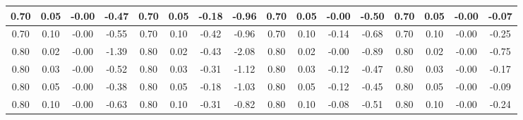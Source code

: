{\begin{tabular}{c|c|c|c||c|c|c|c||c|c|c|c||c|c|c|c}
0.70 & 0.05 & {\cellcolor{green}-0.00} & -0.47 &    0.70 & 0.05 & -0.18 & -0.96 &    0.70 & 0.05 & {\cellcolor{green}-0.00} & -0.50 &    0.70 & 0.05 & {\cellcolor{green}-0.00} & {\cellcolor{yellow}-0.07} \\ \hline
0.70 & 0.10 & {\cellcolor{green}-0.00} & -0.55 &    0.70 & 0.10 & -0.42 & -0.96 &    0.70 & 0.10 & -0.14 & -0.68 &    0.70 & 0.10 & {\cellcolor{green}-0.00} & -0.25 \\ \hline\hline
0.80 & 0.02 & {\cellcolor{green}-0.00} & -1.39 &    0.80 & 0.02 & -0.43 & -2.08 &    0.80 & 0.02 & {\cellcolor{green}-0.00} & -0.89 &    0.80 & 0.02 & {\cellcolor{green}-0.00} & -0.75 \\ \hline
0.80 & 0.03 & {\cellcolor{green}-0.00} & -0.52 &    0.80 & 0.03 & -0.31 & -1.12 &    0.80 & 0.03 & -0.12 & -0.47 &    0.80 & 0.03 & {\cellcolor{green}-0.00} & -0.17 \\ \hline
0.80 & 0.05 & {\cellcolor{green}-0.00} & {\cellcolor{yellow}-0.38} &    0.80 & 0.05 & -0.18 & -1.03 &    0.80 & 0.05 & -0.12 & {\cellcolor{yellow}-0.45} &    0.80 & 0.05 & {\cellcolor{green}-0.00} & -0.09 \\ \hline
0.80 & 0.10 & {\cellcolor{green}-0.00} & -0.63 &    0.80 & 0.10 & -0.31 & {\cellcolor{yellow}-0.82} &    0.80 & 0.10 & -0.08 & -0.51 &    0.80 & 0.10 & {\cellcolor{green}-0.00} & -0.24 \\ \hline\hline



\end{tabular}}

